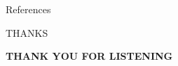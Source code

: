 \documentclass[pdf]{beamer}
\begin{document}
\begin{frame}[allowframebreaks]{References}

\nocite{*}

\end{frame}

\begin{frame}{THANKS}
\begin{LARGE}
\textbf{THANK YOU FOR LISTENING}	
\end{LARGE}
\end{frame}
\end{document}
